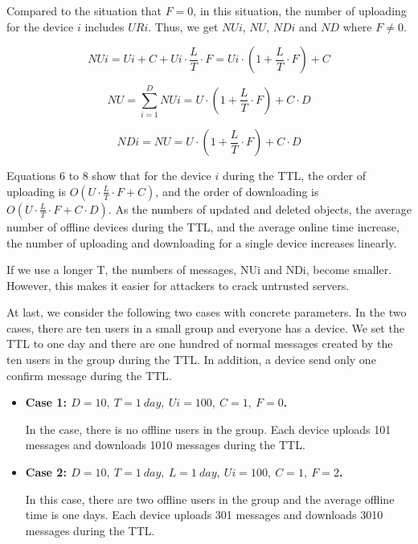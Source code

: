 Compared to the situation that $F=0$, in this situation, the number of uploading for the device $i$ includes $URi$.
Thus, we get $NUi$, $NU$, $NDi$ and $ND$ where $F \neq 0$.

\begin{equation}
NUi = Ui + C + Ui \cdot \frac{L}{T} \cdot F = Ui \cdot (1 + \frac{L}{T} \cdot F) + C
\end{equation}

\begin{equation}
NU = \sum_{i=1}^{D} NUi = U \cdot (1 + \frac{L}{T} \cdot F) + C \cdot D
\end{equation}

\begin{equation}
NDi = NU = U \cdot (1 + \frac{L}{T} \cdot F) + C \cdot D
\end{equation}

Equations 6 to 8 show that for the device $i$ during the TTL, the order of uploading is $O(U \cdot \frac{L}{T} \cdot F + C)$, and the order of downloading is $O(U \cdot \frac{L}{T} \cdot F + C \cdot D)$.
As the numbers of updated and deleted objects, the average number of offline devices during the TTL, and the average online time increase, the number of uploading and downloading for a single device increases linearly.

If we use a longer T, the numbers of messages, NUi and NDi, become smaller.
However, this makes it easier for attackers to crack untrusted servers.

At last, we consider the following two cases with concrete parameters.
In the two cases, there are ten users in a small group and everyone has a device.
We set the TTL to one day and there are one hundred of normal messages created by the ten users in the group during the TTL.
In addition, a device send only one confirm message during the TTL.

\begin{itemize}
	\setlength{\itemsep}{1pt}
	\setlength{\parskip}{0pt}
	\setlength{\parsep}{0pt}
	\item \textbf{Case 1: $D = 10,\ T = 1 \ day,\ Ui = 100,\ C = 1,\ F = 0$.}
	
	In the case, there is no offline users in the group.
	Each device uploads 101 messages and downloads 1010 messages during the TTL.
	\item \textbf{Case 2: $D = 10,\ T = 1 \ day,\ L = 1 \  day,\ Ui = 100,\ C = 1,\ F = 2$.} 
	
	In this case, there are two offline users in the group and the average offline time is one days.
	Each device uploads 301 messages and downloads 3010 messages during the TTL.
\end{itemize}

